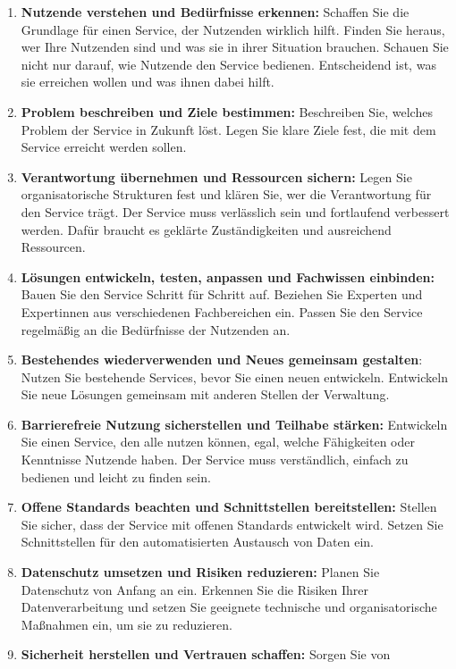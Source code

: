\documentclass[
  11pt,
  letterpaper,
  DIV=11,
  twoside]{scrreprt}
\begin{document}
\begin{enumerate}
\def\labelenumi{\arabic{enumi}.}
\item
  \textbf{Nutzende verstehen und Bedürfnisse erkennen:} Schaffen Sie die
  Grundlage für einen Service, der Nutzenden wirklich hilft. Finden Sie
  heraus, wer Ihre Nutzenden sind und was sie in ihrer Situation
  brauchen. Schauen Sie nicht nur darauf, wie Nutzende den Service
  bedienen. Entscheidend ist, was sie erreichen wollen und was ihnen
  dabei hilft.
\item
  \textbf{Problem beschreiben und Ziele bestimmen:} Beschreiben Sie,
  welches Problem der Service in Zukunft löst. Legen Sie klare Ziele
  fest, die mit dem Service erreicht werden sollen.
\item
  \textbf{Verantwortung übernehmen und Ressourcen sichern:} Legen Sie
  organisatorische Strukturen fest und klären Sie, wer die Verantwortung
  für den Service trägt. Der Service muss verlässlich sein und
  fortlaufend verbessert werden. Dafür braucht es geklärte
  Zuständigkeiten und ausreichend Ressourcen.
\item
  \textbf{Lösungen entwickeln, testen, anpassen und Fachwissen
  einbinden:} Bauen Sie den Service Schritt für Schritt auf. Beziehen
  Sie Experten und Expertinnen aus verschiedenen Fachbereichen ein.
  Passen Sie den Service regelmäßig an die Bedürfnisse der Nutzenden an.
\item
  \textbf{Bestehendes wiederverwenden und Neues gemeinsam gestalten}:
  Nutzen Sie bestehende Services, bevor Sie einen neuen entwickeln.
  Entwickeln Sie neue Lösungen gemeinsam mit anderen Stellen der
  Verwaltung.
\item
  \textbf{Barrierefreie Nutzung sicherstellen und Teilhabe stärken:}
  Entwickeln Sie einen Service, den alle nutzen können, egal, welche
  Fähigkeiten oder Kenntnisse Nutzende haben. Der Service muss
  verständlich, einfach zu bedienen und leicht zu finden sein.
\item
  \textbf{Offene Standards beachten und Schnittstellen bereitstellen:}
  Stellen Sie sicher, dass der Service mit offenen Standards entwickelt
  wird. Setzen Sie Schnittstellen für den automatisierten Austausch von
  Daten ein.
\item
  \textbf{Datenschutz umsetzen und Risiken reduzieren:} Planen Sie
  Datenschutz von Anfang an ein. Erkennen Sie die Risiken Ihrer
  Datenverarbeitung und setzen Sie geeignete technische und
  organisatorische Maßnahmen ein, um sie zu reduzieren.
\item
  \textbf{Sicherheit herstellen und Vertrauen schaffen:} Sorgen Sie von

\end{enumerate}
\end{document}
